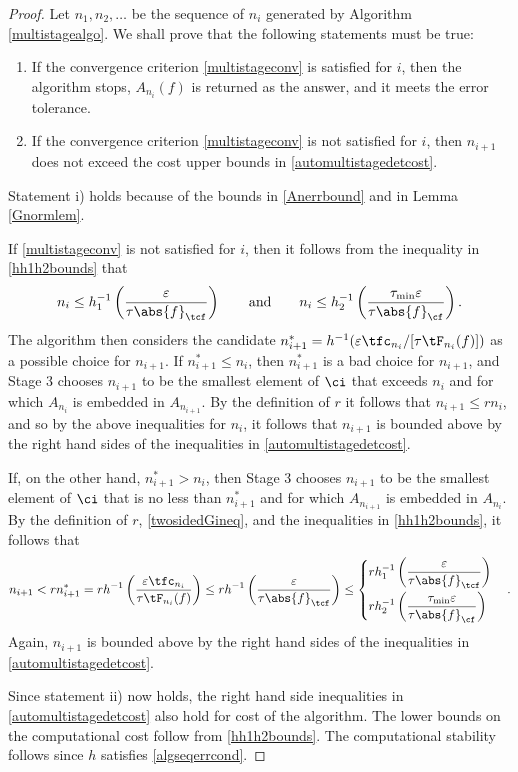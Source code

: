 \documentclass[]{elsarticle}
\theoremstyle{definition}
\theoremstyle{remark}
\newcommand{\Fnorm}[1]{\abs{#1}_{\cf}}
\newcommand{\Ftnorm}[1]{\abs{#1}_{\tcf}}
\begin{document}
\begin{proof} Let $n_1, n_2, \ldots$ be the sequence of $n_i$ generated by Algorithm \ref{multistagealgo}.  We shall prove that the following statements must be true:
\begin{enumerate}
\renewcommand{\labelenumi}{\roman{enumi})}
\item If the convergence criterion \eqref{multistageconv} is satisfied for $i$, then the algorithm stops, $A_{n_i}(f)$ is returned as the answer, and it meets the error tolerance.

\item If the convergence criterion \eqref{multistageconv} is not satisfied for $i$, then $n_{i+1}$ does not exceed the cost upper bounds in \eqref{automultistagedetcost}.

\end{enumerate}
Statement i) holds because of the bounds in \eqref{Anerrbound} and in Lemma \ref{Gnormlem}.

If \eqref{multistageconv} is not satisfied for $i$, then it follows from  the inequality in \eqref{hh1h2bounds} that 
\[
n_{i} \le h_1^{-1}\left(\frac{\varepsilon}{\tau\Ftnorm{f}}\right) \qquad \text{and} \qquad 
n_{i} \le h_2^{-1}\left(\frac{\tau_{\min}\varepsilon}{\tau\Fnorm{f}}\right).
\] 
The algorithm then considers the candidate $n^*_{i+1} = h^{-1}(\varepsilon \tfc_{n_{i}}/[\tau \tF_{n_{i}}(f)])$ as a possible choice for $n_{i+1}$.  If $n^*_{i+1} \le n_{i}$, then $n^*_{i+1}$ is a bad choice for $n_{i+1}$, and Stage 3 chooses $n_{i+1}$ to be the smallest element of $\ci$ that exceeds $n_{i}$ and for which $A_{n_{i}}$ is embedded in $A_{n_{i+1}}$.  By the definition of $r$ it follows that $n_{i+1} \le r  n_{i}$, and so by the above inequalities for $n_{i}$, it follows that $n_{i+1}$ is bounded above by the right hand sides of the inequalities in \eqref{automultistagedetcost}.

If, on the other hand, $n^*_{i+1} > n_{i}$, then Stage 3 chooses $n_{i+1}$ to be the smallest element of $\ci$ that is no less than $n^*_{i+1}$ and for which $A_{n_{i+1}}$ is embedded in $A_{n_i}$.  By the definition of $r$, \eqref{twosidedGineq}, and the inequalities in \eqref{hh1h2bounds}, it follows that
\begin{equation*}
n_{i+1} < r n^*_{i+1} = r h^{-1}\left(\frac{\varepsilon \tfc_{n_{i}}}{\tau \tF_{n_{i}}(f)}\right) \le r  h^{-1}\left(\frac{\varepsilon}{\tau \Ftnorm{f}}\right) \le
\begin{cases}
\displaystyle  rh_1^{-1}\left(\frac{\varepsilon}{\tau \Ftnorm{f}} \right) \\[2ex]
\displaystyle rh_2^{-1}\left(\frac{\tau_{\min}\varepsilon}{\tau \Fnorm{f}} \right)
\end{cases}.
\end{equation*}
Again, $n_{i+1}$ is bounded above by the right hand sides of the inequalities in \eqref{automultistagedetcost}.

Since statement ii) now holds, the right hand side inequalities in \eqref{automultistagedetcost} also hold for cost of the algorithm.  The lower bounds on the computational cost follow from \eqref{hh1h2bounds}.  The computational stability follows since $h$ satisfies \eqref{algseqerrcond}.
\end{proof}
\end{document}
